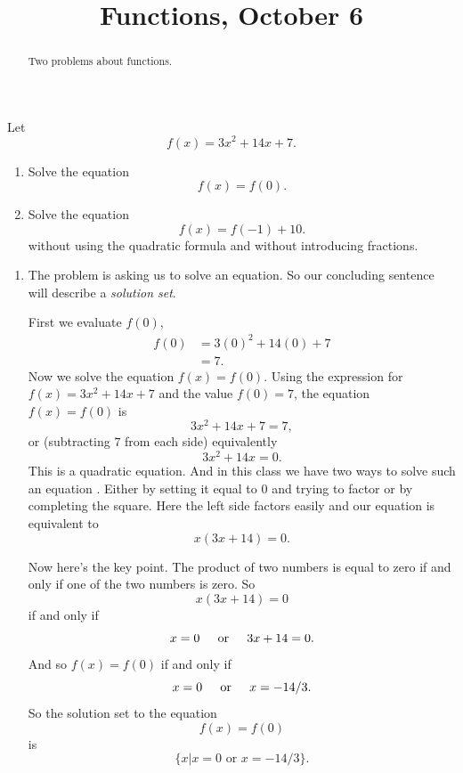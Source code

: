\documentclass{ximera}
\title{Functions, October 6}
\begin{document}
\begin{abstract}
Two problems about functions.
\end{abstract}
\maketitle

\begin{question} \label{Q0f03f3}

\item Let 
\[
    f(x) = 3x^2 + 14x +7 .
\]

\begin{enumerate}
\item Solve the equation
\[
        f(x) = f(0) .
\] 

\item Solve the equation
\[
     f(x) = f(-1) + 10.
\]
without using the quadratic formula and without introducing fractions.
\end{enumerate}

\begin{explanation}
\begin{enumerate}
\item The problem is asking us to solve an equation. So our concluding sentence will describe a \emph{solution set}.

First we evaluate $f(0)$, 
\begin{align*}
     f(0) &= 3(0)^2 + 14(0) + 7 \\
           &=7.
\end{align*}
Now we solve the equation $f(x) = f(0)$. Using the expression for $f(x) = 3x^2 + 14x +7$ and the value $f(0)=7$, the equation $f(x) = f(0)$ is
\[
        3x^2 + 14x + 7 = 7 ,
\]
or (subtracting $7$ from each side) equivalently
\[
      3x^2 + 14x = 0.
\]
This is a quadratic equation. And in this class we have two ways to solve such an equation . Either by setting it equal to $0$ and trying to factor or by completing the square. Here the left side factors easily and our equation is equivalent to 
\[
   x (3x + 14) = 0.
\]

Now here's the key point. The product of two numbers is equal to zero if and only if one of the two numbers is zero. So
\[
  x(3x + 14) = 0
\]
if and only if
\[
     x = 0  \hskip 0.2 in \text{or} \hskip 0.2 in  3x + 14 = 0.
\]
And so $f(x)=f(0)$ if and only if
\[
   x = 0  \hskip 0.2 in \text{or} \hskip 0.2 in  x = -14/3.
\]
So the solution set to the equation
\[
    f(x) = f(0)
\]
is
\[
  \{  x | x = 0 \text{ or } x = -14/3 \}. 
\]


\end{enumerate}
\end{explanation}
\end{question}
\end{document}
